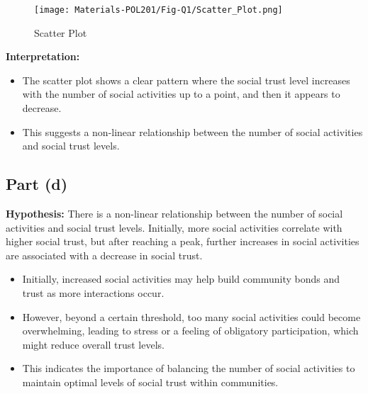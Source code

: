 \documentclass{article}
\begin{document}
\begin{figure}[H]
    \centering
    \texttt{[image: Materials-POL201/Fig-Q1/Scatter\_Plot.png]}
    \caption{Scatter Plot}
    \label{fig:fig1}
\end{figure}

\textbf{Interpretation:}
\begin{itemize}
    \item The scatter plot shows a clear pattern where the social trust level increases with the number of social activities up to a point, and then it appears to decrease.
    \item This suggests a non-linear relationship between the number of social activities and social trust levels.
\end{itemize}

\subsection*{Part (d)}


\textbf{Hypothesis:} There is a non-linear relationship between the number of social activities and social trust levels. Initially, more social activities correlate with higher social trust, but after reaching a peak, further increases in social activities are associated with a decrease in social trust.
\begin{itemize}
    \item Initially, increased social activities may help build community bonds and trust as more interactions occur.
    \item However, beyond a certain threshold, too many social activities could become overwhelming, leading to stress or a feeling of obligatory participation, which might reduce overall trust levels.
    \item This indicates the importance of balancing the number of social activities to maintain optimal levels of social trust within communities.
\end{itemize}
\end{document}
